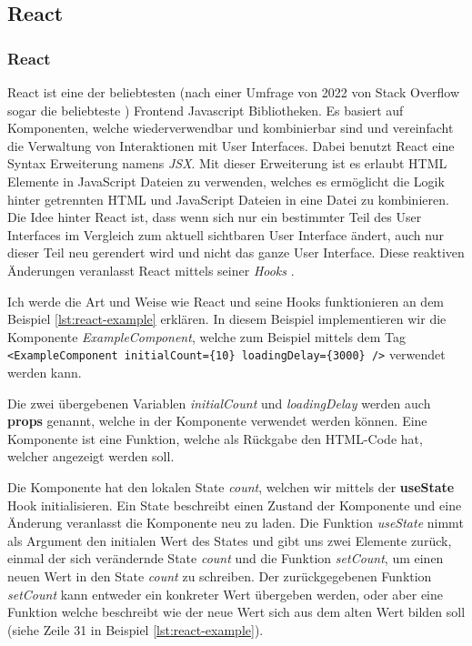         \subsection{React}
        \subsubsection{React}
        \label{sec:react}
React ist eine der beliebtesten (nach einer Umfrage von 2022 von Stack Overflow sogar die beliebteste \cite{stack-overflow-survey}) Frontend Javascript Bibliotheken. Es basiert auf Komponenten, welche wiederverwendbar und kombinierbar sind und vereinfacht die Verwaltung von Interaktionen mit User Interfaces. Dabei benutzt React eine Syntax Erweiterung namens \textit{JSX}. Mit dieser Erweiterung ist es erlaubt HTML Elemente in JavaScript Dateien zu verwenden, welches es ermöglicht die Logik hinter getrennten HTML und JavaScript Dateien in eine Datei zu kombinieren. Die Idee hinter React ist, dass wenn sich nur ein bestimmter Teil des User Interfaces im Vergleich zum aktuell sichtbaren User Interface ändert, auch nur dieser Teil neu gerendert wird und nicht das ganze User Interface. Diese reaktiven Änderungen veranlasst React mittels seiner \textit{Hooks} \cite{react-key-concepts}.

Ich werde die Art und Weise wie React und seine Hooks funktionieren an dem Beispiel \ref{lst:react-example} erklären.
In diesem Beispiel implementieren wir die Komponente \textit{ExampleComponent}, welche zum Beispiel mittels dem Tag \verb|<ExampleComponent initialCount={10} loadingDelay={3000} />| verwendet werden kann. 

Die zwei übergebenen Variablen \textit{initialCount} und \textit{loadingDelay} werden auch \textbf{props} genannt, welche in der Komponente verwendet werden können. Eine Komponente ist eine Funktion, welche als Rückgabe den HTML-Code hat, welcher angezeigt werden soll.

Die Komponente hat den lokalen State \textit{count}, welchen wir mittels der \textbf{useState} Hook initialisieren. Ein State beschreibt einen Zustand der Komponente und eine Änderung veranlasst die Komponente neu zu laden. Die Funktion \textit{useState} nimmt als Argument den initialen Wert des States und gibt uns zwei Elemente zurück, einmal der sich verändernde State \textit{count} und die Funktion \textit{setCount}, um einen neuen Wert in den State \textit{count} zu schreiben. Der zurückgegebenen Funktion \textit{setCount} kann entweder ein konkreter Wert übergeben werden, oder aber eine Funktion welche beschreibt wie der neue Wert sich aus dem alten Wert bilden soll (siehe Zeile 31 in Beispiel \ref{lst:react-example}).

